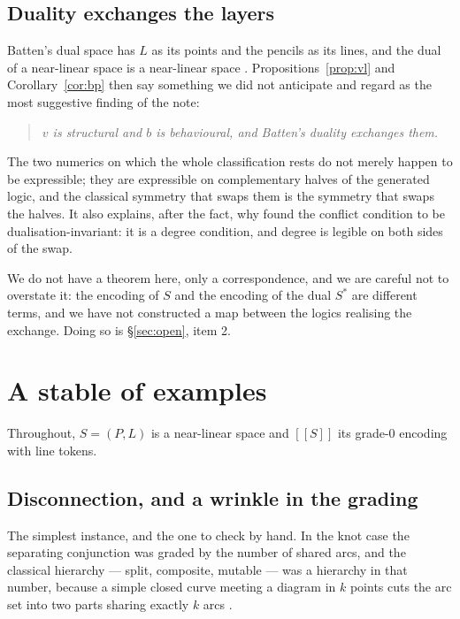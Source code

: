 \documentclass[11pt]{article}
\theoremstyle{plain}
\theoremstyle{definition}
\newcommand{\enc}[1]{[\![#1]\!]}
\begin{document}
\subsection{Duality exchanges the layers}

Batten's dual space has $L$ as its points and the pencils as its lines, and the dual of a
near-linear space is a near-linear space \cite[Lemma 1.3.1]{Batten}. Propositions~\ref{prop:vl} and
Corollary~\ref{cor:bp} then say something we did not anticipate and regard as the most suggestive
finding of the note:

\begin{quote}
\emph{$v$ is structural and $b$ is behavioural, and Batten's duality exchanges them.}
\end{quote}

The two numerics on which the whole classification rests do not merely happen to be expressible;
they are expressible on complementary halves of the generated logic, and the classical symmetry
that swaps them is the symmetry that swaps the halves. It also explains, after the fact, why
\cite[Prop.~13]{Geometry} found the conflict condition to be dualisation-invariant: it is a degree
condition, and degree is legible on both sides of the swap.

We do not have a theorem here, only a correspondence, and we are careful not to overstate it: the
encoding of $S$ and the encoding of the dual $S^{*}$ are different terms, and we have not
constructed a map between the logics realising the exchange. Doing so is \S\ref{sec:open}, item 2.

\section{A stable of examples}
\label{sec:stable}

Throughout, $S=(P,L)$ is a near-linear space and $\enc{S}$ its grade-0 encoding with line tokens.

\subsection{Disconnection, and a wrinkle in the grading}

The simplest instance, and the one to check by hand. In the knot case the separating conjunction
was graded by the number of shared arcs, and the classical hierarchy --- split, composite, mutable
--- was a hierarchy in that number, because a simple closed curve meeting a diagram in $k$ points
cuts the arc set into two parts sharing exactly $k$ arcs \cite[\S4.1]{Classifier}.
\end{document}
